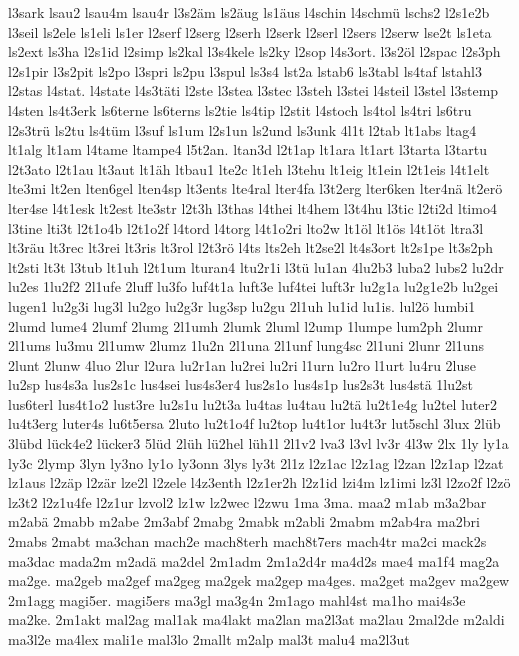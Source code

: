 {l3sark
lsau2
lsau4m
lsau4r
l3s2äm
ls2äug
ls1äus
l4schin
l4schmü
lschs2
l2s1e2b
l3seil
ls2ele
ls1eli
ls1er
l2serf
l2serg
l2serh
l2serk
l2serl
l2sers
l2serw
lse2t
ls1eta
ls2ext
ls3ha
l2s1id
l2simp
ls2kal
l3s4kele
ls2ky
l2sop
l4s3ort.
l3s2öl
l2spac
l2s3ph
l2s1pir
l3s2pit
ls2po
l3spri
ls2pu
l3spul
ls3s4
lst2a
lstab6
ls3tabl
ls4taf
lstahl3
l2stas
l4stat.
l4state
l4s3täti
l2ste
l3stea
l3stec
l3steh
l3stei
l4steil
l3stel
l3stemp
l4sten
ls4t3erk
ls6terne
ls6terns
ls2tie
ls4tip
l2stit
l4stoch
ls4tol
ls4tri
ls6tru
l2s3trü
ls2tu
ls4tüm
l3suf
ls1um
l2s1un
ls2und
ls3unk
4l1t
l2tab
lt1abs
ltag4
lt1alg
lt1am
l4tame
ltampe4
l5t2an.
ltan3d
l2t1ap
lt1ara
lt1art
l3tarta
l3tartu
l2t3ato
l2t1au
lt3aut
lt1äh
ltbau1
lte2c
lt1eh
l3tehu
lt1eig
lt1ein
l2t1eis
l4t1elt
lte3mi
lt2en
lten6gel
lten4sp
lt3ents
lte4ral
lter4fa
l3t2erg
lter6ken
lter4nä
lt2erö
lter4se
l4t1esk
lt2est
lte3str
l2t3h
l3thas
l4thei
lt4hem
l3t4hu
l3tic
l2ti2d
ltimo4
l3tine
lti3t
l2t1o4b
l2t1o2f
l4tord
l4torg
l4t1o2ri
lto2w
lt1öl
lt1ös
l4t1öt
ltra3l
lt3räu
lt3rec
lt3rei
lt3ris
lt3rol
l2t3rö
l4ts
lts2eh
lt2se2l
lt4s3ort
lt2s1pe
lt3s2ph
lt2sti
lt3t
l3tub
lt1uh
l2t1um
lturan4
ltu2r1i
l3tü
lu1an
4lu2b3
luba2
lubs2
lu2dr
lu2es
1lu2f2
2l1ufe
2luff
lu3fo
luf4t1a
luft3e
luf4tei
luft3r
lu2g1a
lu2g1e2b
lu2gei
lugen1
lu2g3i
lug3l
lu2go
lu2g3r
lug3sp
lu2gu
2l1uh
lu1id
lu1is.
lul2ö
lumbi1
2lumd
lume4
2lumf
2lumg
2l1umh
2lumk
2luml
l2ump
1lumpe
lum2ph
2lumr
2l1ums
lu3mu
2l1umw
2lumz
1lu2n
2l1una
2l1unf
lung4sc
2l1uni
2lunr
2l1uns
2lunt
2lunw
4luo
2lur
l2ura
lu2r1an
lu2rei
lu2ri
l1urn
lu2ro
l1urt
lu4ru
2luse
lu2sp
lus4s3a
lus2s1c
lus4sei
lus4s3er4
lus2s1o
lus4s1p
lus2s3t
lus4stä
1lu2st
lus6terl
lus4t1o2
lust3re
lu2s1u
lu2t3a
lu4tas
lu4tau
lu2tä
lu2t1e4g
lu2tel
luter2
lu4t3erg
luter4s
lu6t5ersa
2luto
lu2t1o4f
lu2top
lu4t1or
lu4t3r
lut5schl
3lux
2lüb
3lübd
lück4e2
lücker3
5lüd
2lüh
lü2hel
lüh1l
2l1v2
lva3
l3vl
lv3r
4l3w
2lx
1ly
ly1a
ly3c
2lymp
3lyn
ly3no
ly1o
ly3onn
3lys
ly3t
2l1z
l2z1ac
l2z1ag
l2zan
l2z1ap
l2zat
lz1aus
l2zäp
l2zär
lze2l
l2zele
l4z3enth
l2z1er2h
l2z1id
lzi4m
lz1imi
lz3l
l2zo2f
l2zö
lz3t2
l2z1u4fe
l2z1ur
lzvol2
lz1w
lz2wec
l2zwu
1ma
3ma.
maa2
m1ab
m3a2bar
m2abä
2mabb
m2abe
2m3abf
2mabg
2mabk
m2abli
2mabm
m2ab4ra
ma2bri
2mabs
2mabt
ma3chan
mach2e
mach8terh
mach8t7ers
mach4tr
ma2ci
mack2s
ma3dac
mada2m
m2adä
ma2del
2m1adm
2m1a2d4r
ma4d2s
mae4
ma1f4
mag2a
ma2ge.
ma2geb
ma2gef
ma2geg
ma2gek
ma2gep
ma4ges.
ma2get
ma2gev
ma2gew
2m1agg
magi5er.
magi5ers
ma3gl
ma3g4n
2m1ago
mahl4st
ma1ho
mai4s3e
ma2ke.
2m1akt
mal2ag
mal1ak
ma4lakt
ma2lan
ma2l3at
ma2lau
2mal2de
m2aldi
ma3l2e
ma4lex
mali1e
mal3lo
2mallt
m2alp
mal3t
malu4
ma2l3ut
}
